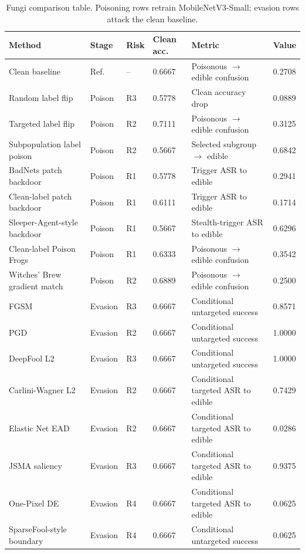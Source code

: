 ﻿\documentclass[6p,10pt,times]{ieeeaccess}
\begin{document}
\begin{table}[t]
\centering
\caption{Fungi comparison table. Poisoning rows retrain MobileNetV3-Small; evasion rows attack the clean baseline.}
\label{tab:results}
\small
\begin{tabular}{p{}p{}p{}p{}p{}p{}}
\toprule
Method & Stage & Risk & Clean acc. & Metric & Value \\
\midrule
Clean baseline & Ref. & -- & 0.6667 & Poisonous \(\rightarrow\) edible confusion & 0.2708 \\
Random label flip & Poison & R3 & 0.5778 & Clean accuracy drop & 0.0889 \\
Targeted label flip & Poison & R2 & 0.7111 & Poisonous \(\rightarrow\) edible confusion & 0.3125 \\
Subpopulation label poison & Poison & R2 & 0.5667 & Selected subgroup \(\rightarrow\) edible & 0.6842 \\
BadNets patch backdoor & Poison & R1 & 0.5778 & Trigger ASR to edible & 0.2941 \\
Clean-label patch backdoor & Poison & R1 & 0.6111 & Trigger ASR to edible & 0.1714 \\
Sleeper-Agent-style backdoor & Poison & R1 & 0.5667 & Stealth-trigger ASR to edible & 0.6296 \\
Clean-label Poison Frogs & Poison & R1 & 0.6333 & Poisonous \(\rightarrow\) edible confusion & 0.3542 \\
Witches' Brew gradient match & Poison & R2 & 0.6889 & Poisonous \(\rightarrow\) edible confusion & 0.2500 \\
FGSM & Evasion & R3 & 0.6667 & Conditional untargeted success & 0.8571 \\
PGD & Evasion & R2 & 0.6667 & Conditional untargeted success & 1.0000 \\
DeepFool L2 & Evasion & R3 & 0.6667 & Conditional untargeted success & 1.0000 \\
Carlini-Wagner L2 & Evasion & R2 & 0.6667 & Conditional targeted ASR to edible & 0.7429 \\
Elastic Net EAD & Evasion & R2 & 0.6667 & Conditional targeted ASR to edible & 0.0286 \\
JSMA saliency & Evasion & R3 & 0.6667 & Conditional targeted ASR to edible & 0.9375 \\
One-Pixel DE & Evasion & R4 & 0.6667 & Conditional targeted ASR to edible & 0.0625 \\
SparseFool-style boundary & Evasion & R4 & 0.6667 & Conditional untargeted success & 0.0625 \\

\end{tabular}
\end{table}
\end{document}
